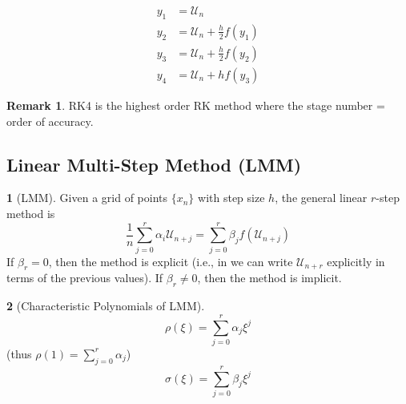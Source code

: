 \documentclass[12pt]{article}
\theoremstyle{definition}
\newtheorem{definition}{\color{NavyBlue}{\textbf{Definition}}}
\newcommand{\U}{\mathcal{U}}
\newtheorem{remark}{Remark}
\theoremstyle{definition}
\begin{document}
\begin{align*}
	y_1 &= \U_n \\
	y_2 &= \U_n + \frac{h}{2}f(y_1) \\
	y_3 &= \U_n + \frac{h}{2}f(y_2) \\
	y_4 &= \U_n + hf(y_3)
\end{align*}

\begin{remark}
	RK4 is the highest order RK method where the stage number = order of accuracy.
\end{remark}

\subsection{Linear Multi-Step Method (LMM)}

\begin{definition}[LMM]
	Given a grid of points $\{x_n\}$ with step size $h$, the general linear $r$-step method is
	\begin{equation}
		\frac{1}{n}\sum_{j=0}^r \alpha_i \U_{n+j} = \sum_{j=0}^r \beta_j f(\U_{n+j})
	\end{equation}
	If $\beta_r = 0$, then the method is explicit (i.e., in we can write $\U_{n+r}$ explicitly in terms of the previous values). If $\beta_r \neq 0$, then the method is implicit. 
\end{definition}

\begin{definition}[Characteristic Polynomials of LMM]
\begin{equation}
	\rho(\xi) = \sum_{j=0}^r \alpha_j \xi^j
\end{equation}
(thus $\rho(1) = \sum_{j=0}^r \alpha_j$)
\begin{equation}
	\sigma(\xi) = \sum_{j=0}^r \beta_j \xi^j
\end{equation}
\end{definition}
\end{document}
